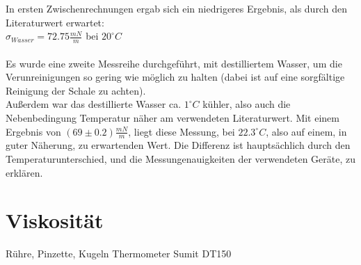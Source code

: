 \documentclass[12pt,a4paper]{article}
\begin{document}
\begin{multicols}{2}

In ersten Zwischenrechnungen ergab sich ein niedrigeres Ergebnis, als durch den Literaturwert erwartet:\\
$\sigma_{Wasser} = 72.75 \frac{mN}{m}$ bei $20^{\circ}C$\\
\\
Es wurde eine zweite Messreihe durchgeführt, mit destilliertem Wasser, um die Verunreinigungen so gering wie möglich zu halten (dabei ist auf eine sorgfältige Reinigung der Schale zu achten). \\
Außerdem war das destillierte Wasser ca. $1^{\circ}C$ kühler, also auch die Nebenbedingung Temperatur näher am verwendeten Literaturwert. Mit einem Ergebnis von $(69 \pm 0.2) \frac{mN}{m}$,  liegt diese Messung, bei $22.3^{\circ}C$, also auf einem, in guter Näherung, zu erwartenden Wert. Die Differenz ist hauptsächlich durch den Temperaturunterschied, und die Messungenauigkeiten der verwendeten Geräte, zu erklären. %

\section{Viskosität}




Rühre, Pinzette, Kugeln
Thermometer Sumit DT150\\

\end{multicols}
\end{document}
